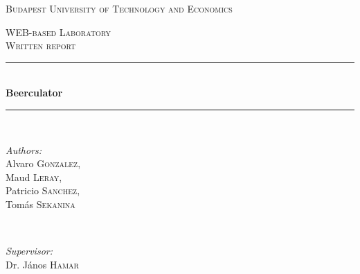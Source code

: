 \documentclass[a4paper]{article}
\begin{document}
\begin{titlepage}

\newcommand{\HRule}{\rule{\linewidth}{0.5mm}}

\center

\begin{spacing}{1.5}
\textsc{\LARGE Budapest University of Technology and Economics}\\[2cm]
\end{spacing}
\textsc{\Large WEB-based Laboratory}\\[0.5cm]
\textsc{\large Written report}\\[0.5cm]

\HRule \\[0.4cm]
{ \huge \bfseries Beerculator}\\[0.4cm] %
\HRule \\[1.5cm]
 
\begin{minipage}{0.4\textwidth}
\begin{flushleft} \large
\emph{Authors:}\\
Alvaro \textsc{Gonzalez},\\
Maud \textsc{Leray},\\
Patricio \textsc{Sanchez},\\
Tomás \textsc{Sekanina}
\end{flushleft}
\end{minipage}
~
\begin{minipage}{0.4\textwidth}
\begin{flushright} \large
\emph{Supervisor:} \\
Dr. János \textsc{Hamar}
\end{flushright}
\end{minipage}\\[4cm]

\end{titlepage}


    \tableofcontents

    \newpage
    
    \newpage
    
    \newpage
    
    \newpage
    
    \newpage
    
    \newpage
    
    \newpage
    
    \newpage
    
    \newpage
    
\end{document}
